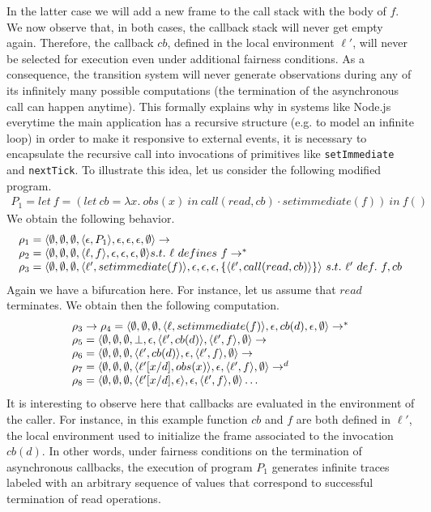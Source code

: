 In the latter case we will add a new frame to the call stack with the body of $f$.
We now observe that, in both cases, the callback stack will never get empty again.
Therefore, the callback $cb$, defined in the local environment $\ell'$, will never be selected for execution even under additional fairness conditions. As a consequence, the transition system will never generate observations during any of its infinitely many possible computations (the termination of the asynchronous call can happen anytime).
This formally explains why in systems like Node.js everytime the main application has a recursive structure  (e.g. to model an infinite loop) in order to make it responsive to external events, it is necessary to  encapsulate the recursive call into invocations of primitives like {\tt setImmediate} and
{\tt nextTick}. To illustrate this idea, let us consider the following modified program.
$$
\begin{array}{l}
P_1=let \ f=(let\ cb=\lambda x.\ obs(x)\ in\ call(read,cb)\cdot setimmediate(f))\ in\ f()
\end{array}
$$
We obtain the following behavior.
$$
\begin{array}{l}
\rho_1=\langle \emptyset,\emptyset,\emptyset,\langle \epsilon,P_1 \rangle,\epsilon,\epsilon,\epsilon,\emptyset \rangle
\rightarrow\\
\rho_2=\langle \emptyset,\emptyset,\emptyset,\langle \ell,f \rangle,\epsilon,\epsilon,\epsilon,\emptyset \rangle s.t.\ \ell\ defines\ f
\rightarrow^*\\
\rho_3=
\langle \emptyset,\emptyset,\emptyset,\langle \ell',setimmediate(f) \rangle,\epsilon,\epsilon,\epsilon,\{\langle \ell',call(read,cb) \rangle\} \rangle
\ s.t.\ \ell'\ def.\ f,cb
\end{array}
$$
Again we have a bifurcation here. For instance, let us assume that $read$ terminates.
We obtain then the following computation.
$$
\begin{array}{l}
\rho_3
\rightarrow
\rho_4=
\langle \emptyset,\emptyset,\emptyset,\langle \ell,setimmediate(f) \rangle,\epsilon,cb(d),\epsilon,\emptyset \rangle
\rightarrow^*\\
\rho_5=
\langle \emptyset,\emptyset,\emptyset,\bot,\epsilon,\langle \ell',cb(d) \rangle,\langle \ell',f \rangle,\emptyset \rangle
\rightarrow\\
\rho_6=
\langle \emptyset,\emptyset,\emptyset,\langle \ell',cb(d) \rangle,\epsilon,\langle \ell',f \rangle,\emptyset \rangle
\rightarrow\\
\rho_7=
\langle \emptyset,\emptyset,\emptyset,\langle \ell'[x/d],obs(x) \rangle,\epsilon,\langle \ell',f \rangle,\emptyset \rangle
\rightarrow^{d}\\
\rho_8=
\langle \emptyset,\emptyset,\emptyset,\langle \ell'[x/d],\epsilon \rangle,\epsilon,\langle \ell',f \rangle,\emptyset \rangle
\ldots
\end{array}
$$
It is interesting to observe here that callbacks are evaluated in the environment of the caller. For instance, in this example function $cb$ and $f$ are both defined in $\ell'$, the local environment 
used to initialize the frame associated to the invocation $cb(d)$. In other words, under fairness conditions on the termination of asynchronous callbacks, the execution of program $P_1$ generates infinite traces labeled with an arbitrary sequence of values that correspond to successful termination of read operations.

